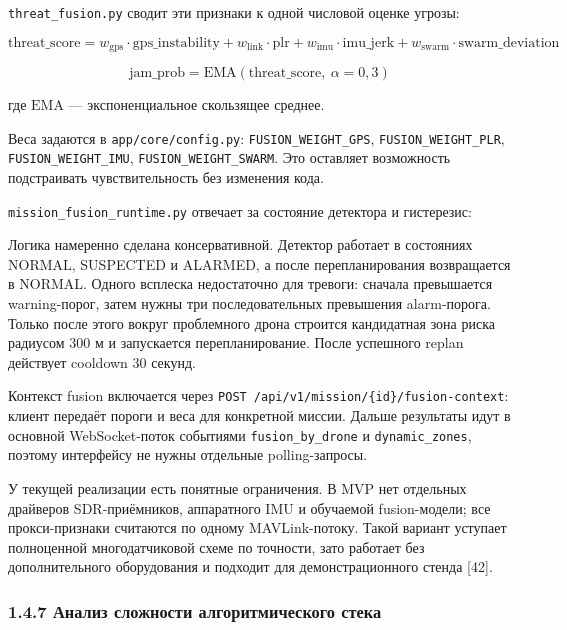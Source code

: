 \documentclass[14pt,a4paper]{extarticle}
\begin{document}
\texttt{threat\_fusion.py} сводит эти признаки к одной числовой оценке угрозы:

\[\mathrm{threat\_score} = w_{\mathrm{gps}} \cdot \mathrm{gps\_instability} + w_{\mathrm{link}} \cdot \mathrm{plr} + w_{\mathrm{imu}} \cdot \mathrm{imu\_jerk} + w_{\mathrm{swarm}} \cdot \mathrm{swarm\_deviation}\]

\[\mathrm{jam\_prob} = \mathrm{EMA}(\mathrm{threat\_score},\ \alpha = 0{,}3)\]

где \(\mathrm{EMA}\) --- экспоненциальное скользящее среднее.

Веса задаются в \texttt{app/core/config.py}: \texttt{FUSION\_WEIGHT\_GPS}, \texttt{FUSION\_WEIGHT\_PLR}, \texttt{FUSION\_WEIGHT\_IMU}, \texttt{FUSION\_WEIGHT\_SWARM}. Это оставляет возможность подстраивать чувствительность без изменения кода.

\texttt{mission\_fusion\_runtime.py} отвечает за состояние детектора и гистерезис:

Логика намеренно сделана консервативной. Детектор работает в состояниях NORMAL, SUSPECTED и ALARMED, а после перепланирования возвращается в NORMAL. Одного всплеска недостаточно для тревоги: сначала превышается warning-порог, затем нужны три последовательных превышения alarm-порога. Только после этого вокруг проблемного дрона строится кандидатная зона риска радиусом 300 м и запускается перепланирование. После успешного replan действует cooldown 30 секунд.


Контекст fusion включается через \texttt{POST\ /api/v1/mission/\{id\}/fusion-context}: клиент передаёт пороги и веса для конкретной миссии. Дальше результаты идут в основной WebSocket-поток событиями \texttt{fusion\_by\_drone} и \texttt{dynamic\_zones}, поэтому интерфейсу не нужны отдельные polling-запросы.

У текущей реализации есть понятные ограничения. В MVP нет отдельных драйверов SDR-приёмников, аппаратного IMU и обучаемой fusion-модели; все прокси-признаки считаются по одному MAVLink-потоку. Такой вариант уступает полноценной многодатчиковой схеме по точности, зато работает без дополнительного оборудования и подходит для демонстрационного стенда {[}42{]}.

\hypertarget{ux430ux43dux430ux43bux438ux437-ux441ux43bux43eux436ux43dux43eux441ux442ux438-ux430ux43bux433ux43eux440ux438ux442ux43cux438ux447ux435ux441ux43aux43eux433ux43e-ux441ux442ux435ux43aux430}{%
\subsubsection{1.4.7 Анализ сложности алгоритмического стека}\label{ux430ux43dux430ux43bux438ux437-ux441ux43bux43eux436ux43dux43eux441ux442ux438-ux430ux43bux433ux43eux440ux438ux442ux43cux438ux447ux435ux441ux43aux43eux433ux43e-ux441ux442ux435ux43aux430}}
\end{document}
